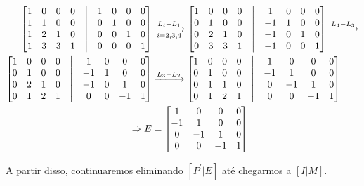 \documentclass[leqno]{article}
\begin{document}
\begin{enumerate}
    \begin{align*}
    \begin{bmatrix}
    1 & 0 & 0 & 0 & \bigm| & 1 & 0 & 0 & 0\\
    1 & 1 & 0 & 0 & \bigm| & 0 & 1 & 0 & 0\\
    1 & 2 & 1 & 0 & \bigm| & 0 & 0 & 1 & 0\\
    1 & 3 & 3 & 1 & \bigm| & 0 & 0 & 0 & 1\\
    \end{bmatrix}&\xrightarrow[i=2,3,4]{L_{i}-L_1}\begin{bmatrix}
    1 & 0 & 0 & 0 & \bigm| & 1 & 0 & 0 & 0\\
    0 & 1 & 0 & 0 & \bigm| & -1 & 1 & 0 & 0\\
    0 & 2 & 1 & 0 & \bigm| & -1 & 0 & 1 & 0\\
    0 & 3 & 3 & 1 & \bigm| & -1 & 0 & 0 & 1\\
    \end{bmatrix}\xrightarrow{L_4-L_3}\\
    \begin{bmatrix}
    1 & 0 & 0 & 0 & \bigm| & 1 & 0 & 0 & 0\\
    0 & 1 & 0 & 0 & \bigm| & -1 & 1 & 0 & 0\\
    0 & 2 & 1 & 0 & \bigm| & -1 & 0 & 1 & 0\\
    0 & 1 & 2 & 1 & \bigm| & 0 & 0 & -1 & 1\\
    \end{bmatrix}&\xrightarrow{L_3-L_2}\begin{bmatrix}
    1 & 0 & 0 & 0 & \bigm| & 1 & 0 & 0 & 0\\
    0 & 1 & 0 & 0 & \bigm| & -1 & 1 & 0 & 0\\
    0 & 1 & 1 & 0 & \bigm| & 0 & -1 & 1 & 0\\
    0 & 1 & 2 & 1 & \bigm| & 0 & 0 & -1 & 1\\
    \end{bmatrix}\\
    \Rightarrow E&=\begin{bmatrix}
    1 & 0 & 0 & 0\\
    -1 & 1 & 0 & 0\\
    0 & -1 & 1 & 0\\
    0 & 0 & -1 & 1\\
    \end{bmatrix}
    \end{align*}
    
    A partir disso, continuaremos eliminando $[P^\prime|E]$ até chegarmos a $[I|M]$.
    

\end{enumerate}
\end{document}
